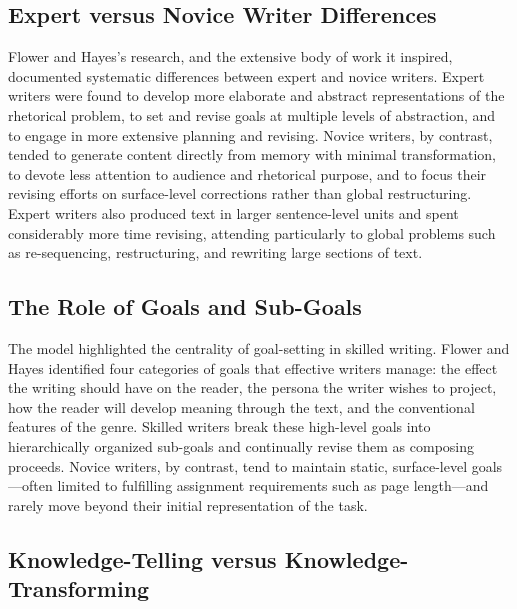 \documentclass[12pt]{article}
\begin{document}
\subsection{Expert versus Novice Writer Differences}

Flower and Hayes's research, and the extensive body of work it inspired, documented systematic differences between expert and novice writers. Expert writers were found to develop more elaborate and abstract representations of the rhetorical problem, to set and revise goals at multiple levels of abstraction, and to engage in more extensive planning and revising. Novice writers, by contrast, tended to generate content directly from memory with minimal transformation, to devote less attention to audience and rhetorical purpose, and to focus their revising efforts on surface-level corrections rather than global restructuring. Expert writers also produced text in larger sentence-level units and spent considerably more time revising, attending particularly to global problems such as re-sequencing, restructuring, and rewriting large sections of text.

\subsection{The Role of Goals and Sub-Goals}

The model highlighted the centrality of goal-setting in skilled writing. Flower and Hayes identified four categories of goals that effective writers manage: the effect the writing should have on the reader, the persona the writer wishes to project, how the reader will develop meaning through the text, and the conventional features of the genre. Skilled writers break these high-level goals into hierarchically organized sub-goals and continually revise them as composing proceeds. Novice writers, by contrast, tend to maintain static, surface-level goals---often limited to fulfilling assignment requirements such as page length---and rarely move beyond their initial representation of the task.

\subsection{Knowledge-Telling versus Knowledge-Transforming}
\end{document}
